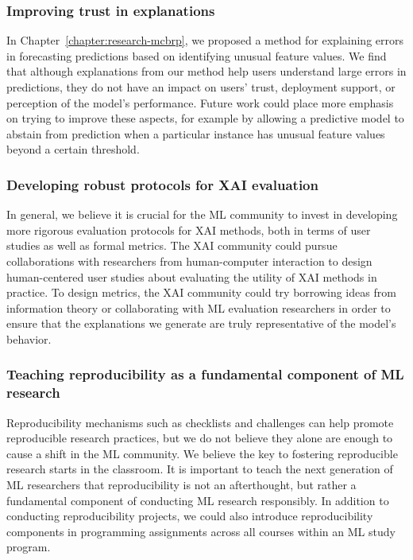 \pagebreak
\subsubsection{Improving trust in explanations}
In Chapter~\ref{chapter:research-mcbrp}, we proposed a method for explaining errors in forecasting predictions based on identifying unusual feature values.
We find that although explanations from our method help users understand large errors in predictions, they do not have an impact on users' trust, deployment support, or perception of the model's performance. 
Future work could place more emphasis on trying to improve these aspects, for example by allowing a predictive model to abstain from prediction when a particular instance has unusual feature values beyond a certain threshold. 




\subsubsection{Developing robust protocols for XAI evaluation}
In general, we believe it is crucial for the ML community to invest in developing more rigorous evaluation protocols for XAI methods, both in terms of user studies as well as formal metrics. 
The XAI community could pursue collaborations with researchers from human-computer interaction to design human-centered user studies about evaluating the utility of XAI methods in practice. 
To design metrics, the XAI community could try borrowing ideas from information theory or collaborating with ML evaluation researchers in order to ensure that the explanations we generate are truly representative of the model's behavior. 




\subsubsection{Teaching reproducibility as a fundamental component of ML research}
Reproducibility mechanisms such as checklists and challenges can help promote reproducible research practices, but we do not believe they alone are enough to cause a shift in the ML community. 
We believe the key to fostering reproducible research starts in the classroom. 
It is important to teach the next generation of ML researchers that reproducibility is not an afterthought, but rather a fundamental component of conducting ML research responsibly. 
In addition to conducting reproducibility projects, we could also introduce reproducibility components in programming assignments across all courses within an ML study program. 



